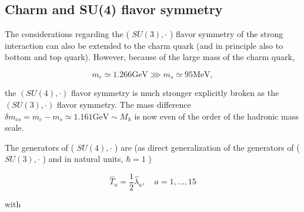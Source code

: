 \documentclass[10pt, letterpaper]{article}
\begin{document}
\subsection{Charm and SU(4) flavor symmetry}
The considerations regarding the ( $S U(3), \cdot$ ) flavor symmetry of the strong interaction can also be extended to the charm quark (and in principle also to bottom and top quark). However, because of the large mass of the charm quark,

$$
m_{c} \simeq 1.266 \mathrm{GeV} \ggg m_{s} \simeq 95 \mathrm{MeV},
$$

the $(S U(4), \cdot)$ flavor symmetry is much stronger explicitly broken as the $(S U(3), \cdot)$ flavor symmetry. The mass difference $\delta m_{c s}=m_{c}-m_{s} \simeq 1.161 \mathrm{GeV} \sim M_{h}$ is now even of the order of the hadronic mass scale.

The generators of ( $S U(4), \cdot$ ) are (as direct generalization of the generators of ( $S U(3), \cdot$ ) and in natural units, $\hbar=1$ )

$$
\hat{T}_{a}=\frac{1}{2} \hat{\lambda}_{a}, \quad a=1, \ldots, 15
$$

with
\end{document}
